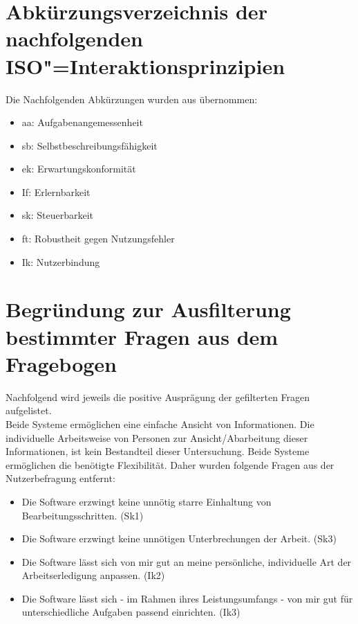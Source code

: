 

\section{Abkürzungsverzeichnis der nachfolgenden ISO"=Interaktionsprinzipien}
\label{Add:Nutzerbefragung_Prümper:ISO-Abkürzungen}
Die Nachfolgenden Abkürzungen wurden aus \cite{Pruemper:Fragebogen-S:2006} übernommen: %
\begin{itemize}
    \item aa: Aufgabenangemessenheit
    \item sb: Selbstbeschreibungsfähigkeit
    \item ek: Erwartungskonformität
    \item If: Erlernbarkeit
    \item sk: Steuerbarkeit
    \item ft: Robustheit gegen Nutzungsfehler
    \item Ik: Nutzerbindung
\end{itemize}

\section{Begründung zur Ausfilterung bestimmter Fragen aus dem Fragebogen \cite{Pruemper:Fragebogen-S:2006}}
\label{Add:Nutzerbefragung_Prümper:Begründung_Filterung}

Nachfolgend wird jeweils die positive Ausprägung der gefilterten Fragen aufgelistet.\\

\noindent
Beide Systeme ermöglichen eine einfache Ansicht von Informationen. Die individuelle Arbeitsweise von Personen zur Ansicht/Abarbeitung dieser Informationen, ist kein Bestandteil dieser Untersuchung.
Beide Systeme ermöglichen die benötigte Flexibilität. Daher wurden folgende Fragen aus der Nutzerbefragung entfernt:
\begin{itemize}
    \item Die Software erzwingt keine unnötig starre Einhaltung von Bearbeitungsschritten. (Sk1) %
    \item Die Software erzwingt keine unnötigen Unterbrechungen der Arbeit. (Sk3) %
    \item Die Software lässt sich von mir gut an meine persönliche, individuelle Art der Arbeitserledigung anpassen. (Ik2) %
    \item Die Software lässt sich - im Rahmen ihres Leistungsumfangs - von mir gut für unterschiedliche Aufgaben passend einrichten. (Ik3) %
\end{itemize}


